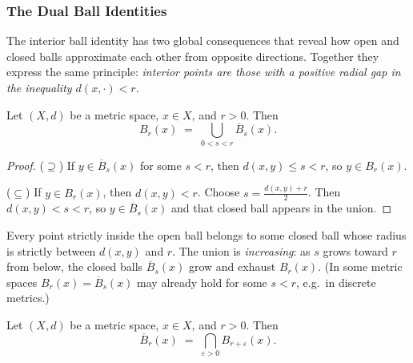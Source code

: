 
\subsubsection*{The Dual Ball Identities}

The interior ball identity has two global consequences that reveal how
open and closed balls approximate each other from opposite directions.
Together they express the same principle: \emph{interior points are those
with a positive radial gap in the inequality $d(x,\cdot)<r$.}

\begin{proposition}
\label{prop:open-as-union-closed}
Let $(X,d)$ be a metric space, $x\in X$, and $r>0$.
Then
\[
B_r(x) \;=\; \bigcup_{0 < s < r} \overline{B}_s(x).
\]
\end{proposition}

\begin{proof}
($\supseteq$)\;
If $y\in\overline{B}_s(x)$ for some $s<r$, then $d(x,y)\le s<r$, so
$y\in B_r(x)$.

($\subseteq$)\;
If $y\in B_r(x)$, then $d(x,y)<r$.
Choose $s = \tfrac{d(x,y)+r}{2}$.
Then $d(x,y) < s < r$, so $y\in\overline{B}_s(x)$ and that closed ball
appears in the union.
\end{proof}

\begin{remark*}
Every point strictly inside the open ball belongs to some closed ball
whose radius is strictly between $d(x,y)$ and $r$.
The union is \emph{increasing}: as $s$ grows toward $r$ from below, the
closed balls $\overline{B}_s(x)$ grow and exhaust $B_r(x)$.
(In some metric spaces $B_r(x) = \overline{B}_s(x)$ may already hold
for some $s < r$, e.g.\ in discrete metrics.)
\end{remark*}

\begin{proposition}
\label{prop:closed-as-int-open}
Let $(X,d)$ be a metric space, $x\in X$, and $r>0$.
Then
\[
\overline{B}_r(x) \;=\; \bigcap_{\varepsilon > 0} B_{r+\varepsilon}(x).
\]
\end{proposition}

